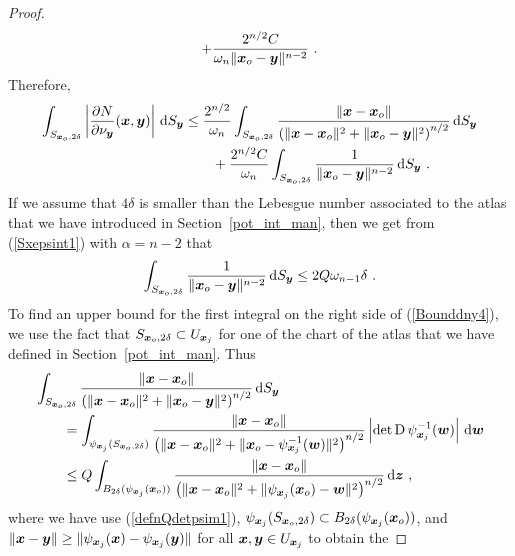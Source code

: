 \begin{proof}
\begin{align*}
+ \frac{2^{n/2} C}{\omega_n \|{\bm{x}}_o-{\bm{y}}\|^{n-2}} \ .
\end{align*}
Therefore,
\begin{equation} \label{Bounddny4}
\begin{split}
\int_{S_{{\bm{x}}_o,2\delta}}
\left| \frac{\partial{N}}{\partial \nu_{{\bm{y}}}}({\bm{x}},{\bm{y}}) \right| \,\mathrm{d}{S}_{{\bm{y}}}
&\leq \frac{2^{n/2}}{\omega_n} \int_{S_{{\bm{x}}_o,2\delta}}
\frac{\left\|{\bm{x}}-{\bm{x}}_o\right\|}
{\left(\|{\bm{x}}-{\bm{x}}_o\|^2 + \|{\bm{x}}_o-{\bm{y}}\|^2\right)^{n/2}}
\,\mathrm{d}{S}_{{\bm{y}}} \\
&\qquad + \frac{2^{n/2} C}{\omega_n} \int_{S_{{\bm{x}}_o,2\delta}}
\frac{1}{\|{\bm{x}}_o-{\bm{y}}\|^{n-2}} \,\mathrm{d}{S}_{{\bm{y}}} \ .
\end{split}
\end{equation}
If we assume that $4\delta$ is smaller than the Lebesgue number
associated to the atlas that we have introduced in
Section~\ref{pot_int_man}, then we get from (\ref{Sxepsint1}) with
$\alpha = n-2$ that
\begin{equation} \label{Bounddny5}
\int_{S_{{\bm{x}}_o,2\delta}} \frac{1}{\|{\bm{x}}_o-{\bm{y}}\|^{n-2}} \,\mathrm{d}{S}_{{\bm{y}}}
\leq 2 Q \omega_{n-1} \delta \ .
\end{equation}
To find an upper bound for the first integral on the right side of
(\ref{Bounddny4}), we use the fact that
$S_{{\bm{x}}_o,2\delta} \subset U_{{\bm{x}}_j}$ for one of the chart of
the atlas that we have defined in Section~\ref{pot_int_man}.
Thus
\begin{align*}
&\int_{S_{{\bm{x}}_o,2\delta}}
\frac{\left\|{\bm{x}}-{\bm{x}}_o\right\|}
{\left(\|{\bm{x}}-{\bm{x}}_o\|^2 + \|{\bm{x}}_o-{\bm{y}}\|^2\right)^{n/2}}
\,\mathrm{d}{S}_{{\bm{y}}} \\
&\qquad = \int_{\psi_{{\bm{x}}_j}(S_{{\bm{x}}_o,2\delta})}
\frac{\left\|{\bm{x}}-{\bm{x}}_o\right\|}
{\left(\|{\bm{x}}-{\bm{x}}_o\|^2
+ \|{\bm{x}}_o-\psi_{{\bm{x}}_j}^{-1}({\bm{w}})\|^2\right)^{n/2}}
\left| \det \operatorname{D} \psi_{{\bm{x}}_j}^{-1}({\bm{w}}) \right| \,\mathrm{d}{{\bm{w}}} \\
&\qquad \leq Q \int_{B_{2\delta}(\psi_{{\bm{x}}_j}({\bm{x}}_o))}
\frac{\left\|{\bm{x}}-{\bm{x}}_o\right\|}
{\left(\|{\bm{x}}-{\bm{x}}_o\|^2
+ \|\psi_{{\bm{x}}_j}({\bm{x}}_o) -{\bm{w}}\|^2\right)^{n/2}} \,\mathrm{d}{{\bm{z}}} \ ,
\end{align*}
where we have use (\ref{defnQdetpsim1}),
$\displaystyle \psi_{{\bm{x}}_j}(S_{{\bm{x}}_o,2\delta}) \subset
B_{2\delta}(\psi_{{\bm{x}}_j}({\bm{x}}_o))$, and
$\displaystyle \|{\bm{x}}-{\bm{y}}\| 
\geq \|\psi_{{\bm{x}}_j}({\bm{x}}) - \psi_{{\bm{x}}_j}({\bm{y}})\|$ for all
$\displaystyle {\bm{x}},{\bm{y}} \in U_{{\bm{x}}_j}$ to obtain the

\end{proof}

